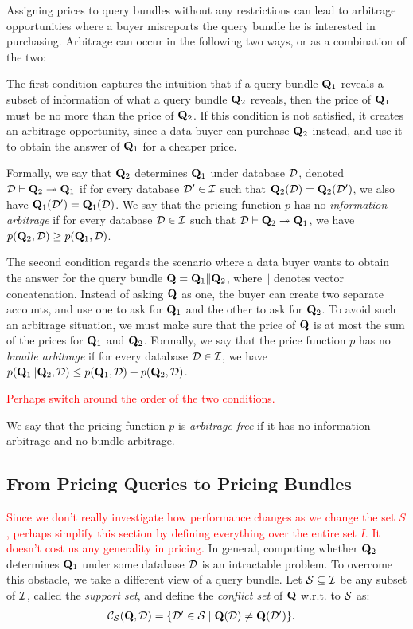 Assigning prices to query bundles without any restrictions can lead to arbitrage opportunities where a buyer misreports the query bundle he is interested in purchasing. Arbitrage can occur in the following two ways, or as a combination of the two:

 The first condition captures the intuition that if a query bundle $\mathbf{Q}_1$ reveals a subset of information of what a query bundle $\mathbf{Q}_2$ reveals, then the price of $\mathbf{Q}_1$ must be no more than the price of $\mathbf{Q}_2$. If this condition is not satisfied, it creates an arbitrage opportunity, since a data buyer can purchase $\mathbf{Q}_2$ instead, and use it to obtain the answer of $\mathbf{Q}_1$ for a cheaper price. 

Formally, we say that $\mathbf{Q}_2$ determines $\mathbf{Q}_1$ under database $\mathcal{D}$, denoted $\mathcal{D} \vdash \mathbf{Q}_2 \twoheadrightarrow \mathbf{Q}_1$ if for every database $\mathcal{D}' \in \mathcal{I}$ such that $\mathbf{Q}_2(\mathcal{D}) = \mathbf{Q}_2(\mathcal{D}')$, we also have  $\mathbf{Q}_1(\mathcal{D}') = \mathbf{Q}_1(\mathcal{D})$.
We say that the pricing function $p$ has no {\em information arbitrage} if for every database $\mathcal{D} \in \mathcal{I}$ such that $\mathcal{D} \vdash \mathbf{Q}_2 \twoheadrightarrow \mathbf{Q}_1$, we have $p(\mathbf{Q}_2, \mathcal{D}) \geq  p(\mathbf{Q}_1, \mathcal{D})$. 

 The second condition regards the scenario where a data buyer wants to obtain the answer for the query bundle $\mathbf{Q} = \mathbf{Q}_1\Vert \mathbf{Q}_2$, where $\Vert$ denotes vector concatenation. Instead of asking $\mathbf{Q}$ as one, the buyer can create two separate accounts, and use one to ask for $\mathbf{Q}_1$ and the other to ask for $\mathbf{Q}_2$. To avoid such an arbitrage situation, we must make sure that the price of $\mathbf{Q}$ is at most the sum of the prices for $\mathbf{Q}_1$ and  $\mathbf{Q}_2$. 
%
Formally, we say that the price function $p$ has no {\em bundle arbitrage} if for every database $\mathcal{D} \in \mathcal{I}$, we have $p(\mathbf{Q}_1\Vert \mathbf{Q}_2, \mathcal{D}) \leq p(\mathbf{Q}_1, \mathcal{D}) + p(\mathbf{Q}_2, \mathcal{D})$. 

\textcolor{red}{Perhaps switch around the order of the two conditions.}

We say that the pricing function $p$ is {\em arbitrage-free} if it has no information arbitrage and no bundle arbitrage. 

\subsection{From Pricing Queries to Pricing Bundles}

\textcolor{red}{Since we don't really investigate how performance changes as we change the set $S$, perhaps simplify this section by defining everything over the entire set $I$. It doesn't cost us any generality in pricing.}
In general, computing whether $\mathbf{Q}_2$ determines $\mathbf{Q}_1$ under some database $\mathcal{D}$ is an intractable problem. To overcome this obstacle, we take a different view of a query bundle. Let 
$\mathcal{S} \subseteq \mathcal{I}$ be any subset of $\mathcal{I}$, called the {\em support set}, and define the {\em conflict set} of $\mathbf{Q}$ w.r.t. to $\mathcal{S}$ as:
%
\begin{align*}
{\mathcal{C}}_{\mathcal{S}}(\mathbf{Q},\mathcal{D})  &= \{{\mathcal{D}' \in \mathcal{S}}\mid{\mathbf{Q}(\mathcal{D}) \neq \mathbf{Q}(\mathcal{D}')}\}. 
\end{align*}


